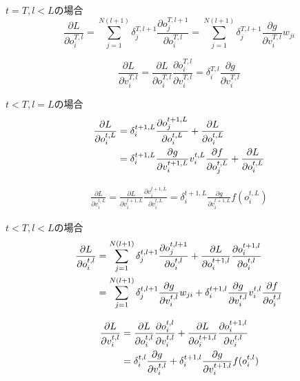 $t=T, l<L$の場合
\begin{equation}
    \frac{\partial L}{\partial o_i^{T,l}} 
    = \sum_{j=1}^{N(l+1)} \delta_j^{T,l+1} \frac{\partial o_j^{T,l+1}}{\partial o_i^{T,l}} 
    = \sum_{j=1}^{N(l+1)} \delta_j^{T,l+1} \frac{\partial g}{\partial v_i^{T, l}} w_{ji}
\end{equation}

\begin{equation}
    \frac{\partial L}{\partial v_i^{T,l}} 
    = \frac{\partial L}{\partial o_i^{T,l}} \frac{\partial o_i^{T,l}}{\partial v_i^{T,l}} 
    = \delta_i^{T,l} \frac{\partial g}{\partial v_i^{T,l}} \label{eq:stbp:v:case2}
\end{equation}

$t<T, l=L$の場合
\begin{align}
    \frac{\partial L}{\partial o_i^{t,L}} 
    &= \delta_i^{t+1,L} \frac{\partial o_j^{t+1,L}}{\partial o_i^{t,L}} + \frac {\partial L} {\partial o_i^{t,L}} \notag \\ 
    &= \delta_i^{t+1,L} \frac{\partial g}{\partial v_i^{t+1,L}} v_i^{t,L} \frac{\partial f}{\partial o_j^{t,L}} + \frac {\partial L} {\partial o_i^{t,L}}
\end{align}

\begin{align}
    \frac{\partial L}{\partial v_i^{t,L}} 
    = \frac {\partial L} {\partial v_i^{t+1,L}} \frac {\partial v_i^{t+1,L}} {\partial v_i^{t,L}} 
    = \delta_i^{t+1,L} \frac {\partial g} {\partial v_i^{t+1,L}} f(o_i^{t,L}) \label{eq:stbp:v:case3}
\end{align}

$t<T, l<L$の場合
\begin{align}
    \frac{\partial L}{\partial o_i^{t,l}} 
    &= \sum_{j=1}^{N(l+1)} \delta_j^{t,l+1} \frac{\partial o_j^{t,l+1}}{\partial o_i^{t,l}} + \frac {\partial L} {\partial o_i^{t+1,l}} \frac{\partial o_i^{t+1,l}}{\partial o_i^{t,l}}  \notag \\
    &= \sum_{j=1}^{N(l+1)} \delta_j^{t,l+1} \frac{\partial g}{\partial v_i^{t,l}} w_{ji} 
    + \delta_i^{t+1,l} \frac{\partial g}{\partial v_i^{t,l}} v_i^{t,l} \frac{\partial f}{\partial o_i^{t,l}}
\end{align}         

\begin{align}
    \frac{\partial L}{\partial v_i^{t,l}} 
    &= \frac {\partial L} {\partial o_i^{t,l}} \frac {\partial o_i^{t,l}} {\partial v_i^{t,l}} + \frac {\partial L} {\partial o_i^{t+1,l}} \frac {\partial o_i^{t+1,l}} {\partial v_i^{t,l}} \notag \\
    &= \delta_i^{t,l} \frac {\partial g} {\partial v_i^{t,l}} 
    + \delta_i^{t+1,l} \frac {\partial g} {\partial v_i^{t+1,l}} f(o_i^{t,l}) \label{eq:stbp:v:case4}
\end{align}


